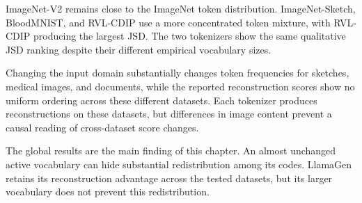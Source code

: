 ImageNet-V2 remains close to the ImageNet token distribution.
ImageNet-Sketch, BloodMNIST, and RVL-CDIP use a more concentrated token mixture,
with RVL-CDIP producing the largest JSD. The two tokenizers show the same
qualitative JSD ranking despite their different empirical vocabulary sizes.

Changing the input domain substantially changes token frequencies for sketches,
medical images, and documents, while the reported reconstruction scores show
no uniform ordering across these different datasets. Each tokenizer produces
reconstructions on these datasets, but differences in image content prevent a
causal reading of cross-dataset score changes.

The global results are the main finding of this chapter. An almost unchanged
active vocabulary can hide substantial redistribution among its codes.
LlamaGen retains its reconstruction advantage across the tested datasets,
but its larger vocabulary does not prevent this redistribution.
